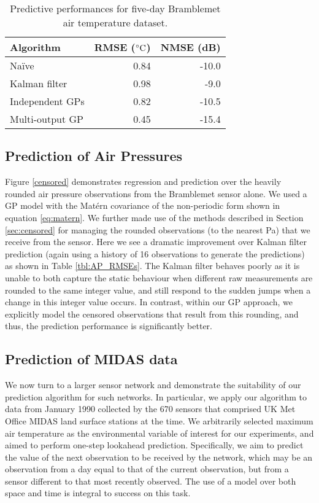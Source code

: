 \documentclass{acmsmall}
\begin{document}
\begin{table}
\centering
\caption{Predictive performances for five-day Bramblemet air temperature dataset.}
\label{tbl:AT_RMSEs}
 \begin{tabular}{@{}lrr@{}}
 \\
 \toprule
Algorithm & RMSE ($\degree\text{C}$) & NMSE (dB)\\
\midrule
Na\"{i}ve & 0.84 & -10.0\\
Kalman filter & 0.98 & -9.0\\
Independent GPs & 0.82 & -10.5 \\
Multi-output GP & 0.45 & -15.4\\
\bottomrule
\end{tabular}
\end{table}

\subsection{Prediction of Air Pressures}

\noindent Figure \ref{censored} demonstrates regression and prediction over the heavily rounded air pressure observations from the Bramblemet sensor alone. We used a GP model with the Mat\'{e}rn covariance of the non-periodic form shown in equation \eqref{eq:matern}. We further made use of the methods described in Section \ref{sec:censored} for managing the rounded observations (to the nearest Pa) that we receive from the sensor. Here we see a dramatic improvement over Kalman filter prediction (again using a history of 16 observations to generate the predictions) as shown in Table \ref{tbl:AP_RMSEs}. The Kalman filter behaves poorly as it is unable to both capture the static behaviour when different raw measurements are rounded to the same integer value, and still respond to the sudden jumps when a change in this integer value occurs. In contrast, within our GP approach, we explicitly model the censored observations that result from this rounding, and thus, the prediction performance is significantly better.

\subsection{Prediction of MIDAS data}

We now turn to a larger sensor network and demonstrate the suitability of our prediction algorithm for such networks. In particular, we apply our algorithm to data from January 1990 collected by the 670 sensors that comprised UK Met Office MIDAS land
surface stations at the time. We arbitrarily selected maximum air temperature as the environmental variable of interest for our experiments, and aimed to perform one-step lookahead prediction. Specifically, we aim to predict the value of the next observation to be received by the network, which may be an observation from a day equal to that of the current observation, but from a sensor different to that most recently observed. The use of a model over both space and time is integral to success on this task.
\end{document}
